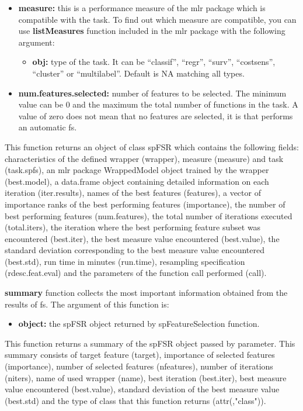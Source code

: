 \begin{itemize}
    \item \textbf{measure:} this is a performance measure of the mlr package which is compatible with the task. To find out which measure are compatible, you can use \textbf{listMeasures} function included in the mlr package with the following argument:
    
    \begin{itemize}
        \item \textbf{obj:} type of the task. It can be “classif”, “regr”, “surv”, “costsens”, “cluster” or “multilabel”. Default is NA matching all types.
    \end{itemize}
    
    \item \textbf{num.features.selected:} number of features to be selected. The minimum value can be 0 and the maximum the total number of functions in the task. A value of zero does not mean that no features are selected, it is that performs an automatic \acrshort{fs}.
\end{itemize}

This function returns an object of class spFSR which contains the following fields: characteristics of the defined wrapper (wrapper), measure (measure) and task (task.spfs), an mlr package WrappedModel object trained by the wrapper (best.model), a data.frame object containing detailed information on each iteration (iter.results), names of the best features (features), a vector of importance ranks of the best performing features (importance), the number of best performing features (num.features), the total number of iterations executed (total.iters), the iteration where the best performing feature subset was encountered (best.iter), the best measure value encountered (best.value), the standard deviation corresponding to the best measure value encountered (best.std), run time in minutes (run.time), resampling specification (rdesc.feat.eval) and the parameters of the function call performed (call).

\textbf{summary} function collects the most important information obtained from the results of \acrshort{fs}. The argument of this function is:

\begin{itemize}
    \item \textbf{object:} the spFSR object returned by spFeatureSelection function.
\end{itemize}

This function returns a summary of the spFSR object passed by parameter. This summary consists of target feature (target), importance of selected features (importance), number of selected features (nfeatures), number of iterations (niters), name of used wrapper (name), best iteration (best.iter), best measure value encountered (best.value), standard deviation of the best measure value (best.std) and the type of class that this function returns (attr(,"class")).

